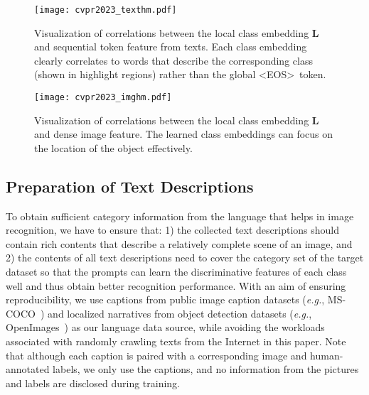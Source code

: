 \documentclass[10pt,twocolumn,letterpaper]{article}
\begin{document}
\begin{figure*}
  \centering
\texttt{[image: cvpr2023\_texthm.pdf]}

  \caption{Visualization of correlations between the local class embedding $\boldsymbol L$ and sequential token feature from texts. 
Each class embedding clearly correlates to words that describe the corresponding class (shown in highlight regions) rather than the global \textless EOS\textgreater~token.
}
  \label{fig:texthm}
\end{figure*}

\begin{figure}
  \centering
\texttt{[image: cvpr2023\_imghm.pdf]}

  \caption{Visualization of correlations between the local class embedding $\boldsymbol L$ and dense image feature. The learned class embeddings can focus on the location of the object effectively.} \vskip -0.18in
  \label{fig:imghm}
\end{figure}

\subsection{Preparation of Text Descriptions}
\label{methods1}
To obtain sufficient category information from the language that helps in image recognition, we have to ensure that: 1) the collected text descriptions should contain rich contents that describe a relatively complete scene of an image, and 2) the contents of all text descriptions need to cover the category set of the target dataset so that the prompts can learn the discriminative features of each class well and thus obtain better recognition performance.
With an aim of ensuring reproducibility, we use captions from public image caption datasets (\emph{e.g.}, MS-COCO~\cite{coco}) and localized narratives from object detection datasets (\emph{e.g.}, OpenImages~\cite{openimages}) as our language data source, while avoiding the workloads associated with randomly crawling texts from the Internet in this paper. Note that although each caption is paired with a corresponding image and human-annotated labels, we only use the captions, and no information from the pictures and labels are disclosed during training.
\end{document}
